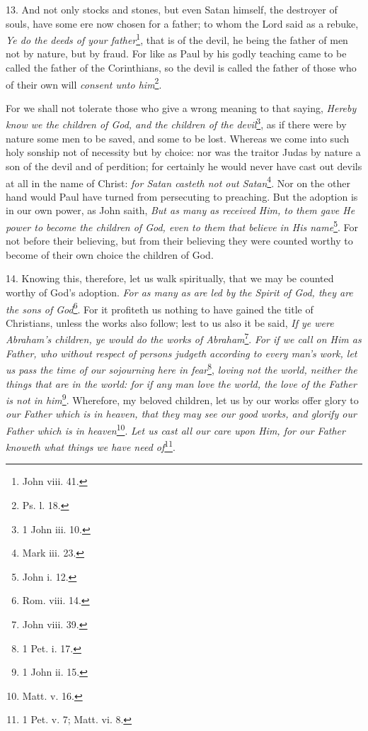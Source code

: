13. And not only stocks and stones, but even Satan himself, the destroyer of souls, have some ere now chosen for a father; to whom the Lord said as a rebuke, \emph{Ye do the deeds of your father}\footnote{John viii. 41.}, that is of the devil, he being the father of men not by nature, but by fraud. For like as Paul by his godly teaching came to be called the father of the Corinthians, so the devil is called the father of those who of their own will \emph{consent unto him}\footnote{Ps. l. 18.}.

For we shall not tolerate those who give a wrong meaning to that saying, \emph{Hereby know we the children of God, and the children of the devil}\footnote{1 John iii. 10.}, as if there were by nature some men to be saved, and some to be lost. Whereas we come into such holy sonship not of necessity but by choice: nor was the traitor Judas by nature a son of the devil and of perdition; for certainly he would never have cast out devils at all in the name of Christ: \emph{for Satan casteth not out Satan}\footnote{Mark iii. 23.}. Nor on the other hand would Paul have turned from persecuting to preaching. But the adoption is in our own power, as John saith, \emph{But as many as received Him, to them gave He power to become the children of God, even to them that believe in His name}\footnote{John i. 12.}. For not before their believing, but from their believing they were counted worthy to become of their own choice the children of God.

14. Knowing this, therefore, let us walk spiritually, that we may be counted worthy of God’s adoption. \emph{For as many as are led by the Spirit of God, they are the sons of God}\footnote{Rom. viii. 14.}. For it profiteth us nothing to have gained the title of Christians, unless the works also follow; lest to us also it be said, \emph{If ye were Abraham’s children, ye would do the works of Abraham}\footnote{John viii. 39.}. \emph{For if we call on Him as Father, who without respect of persons judgeth according to every man’s work, let us pass the time of our sojourning here in fear}\footnote{1 Pet. i. 17.}, \emph{loving not the world, neither the things that are in the world: for if any man love the world, the love of the Father is not in him}\footnote{1 John ii. 15.}. Wherefore, my beloved children, let us by our works offer glory to \emph{our Father which is in heaven, that they may see our good works, and glorify our Father which is in heaven}\footnote{Matt. v. 16.}. \emph{Let us cast all our care upon Him, for our Father knoweth what things we have need of}\footnote{1 Pet. v. 7; Matt. vi. 8.}.

